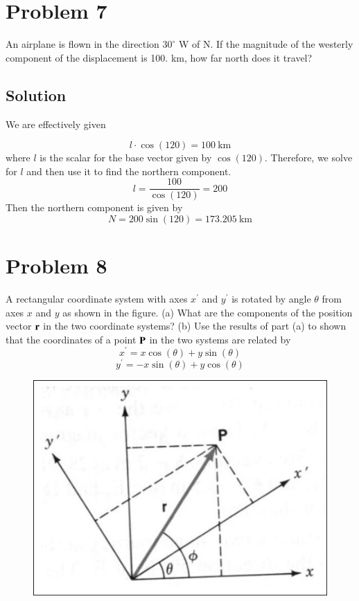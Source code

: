 \documentclass{article}
\begin{document}
\section*{Problem 7}
An airplane is flown in the direction $30^\circ$ W of N. If the magnitude of the westerly component
of the displacement is 100. km, how far north does it travel?

\subsection*{Solution}
We are effectively given

\[
	l \cdot \cos(120) = 100\ \text{km}
\]
where $l$ is the scalar for the base vector given by $\cos (120)$. Therefore, we solve for $l$ and then use it to find the northern component.
\[
	l = \frac{100}{\cos(120)} = 200
\]
Then the northern component is given by
\[
	N = 200 \sin(120) = 173.205\ \text{km}
\]

\section*{Problem 8}
A rectangular coordinate system with axes $x^\prime$ and $y^\prime$ is rotated by angle $\theta$ from axes $x$ and $y$
as shown in the figure. (a) What are the components of the position vector $\vb r$ in the two
coordinate systems? (b) Use the results of part (a) to shown that the coordinates of a point $\vb P$ in
the two systems are related by
\[
	x^\prime = x\cos(\theta) + y\sin(\theta)
\]
\[
	y^\prime = -x\sin(\theta) + y\cos(\theta)
\]

\begin{figure}[ht]
    \centering
    \includegraphics[scale=0.5]{graph-3.png}
\end{figure}
\end{document}

